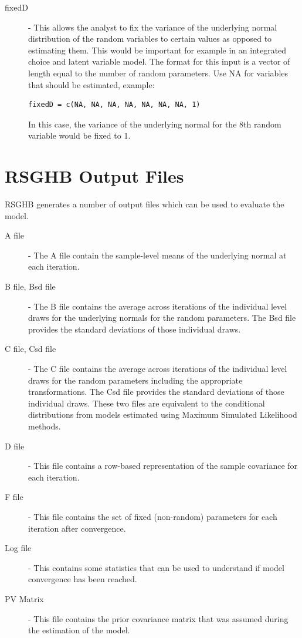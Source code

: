 \documentclass{article}\usepackage[]{graphicx}\usepackage[]{color}
\begin{document}
\begin{description}
\item[fixedD] - This allows the analyst to fix the variance of the underlying normal distribution of the random variables to certain values as opposed to estimating them. This would be important for example in an integrated choice and latent variable model. The format for this input is a vector of length equal to the number of random parameters. Use NA for variables that should be estimated, example:
 \begin{verbatim}fixedD = c(NA, NA, NA, NA, NA, NA, NA, 1)\end{verbatim} In this case, the variance of the underlying normal for the 8th random variable would be fixed to 1.

\end{description}     

\section*{RSGHB Output Files}

RSGHB generates a number of output files which can be used to evaluate the model.

\begin{description}

\item[A file] - The A file contain the sample-level means of the underlying normal at each iteration. 

\item[B file, Bsd file] - The B file contains the average across iterations of the individual level draws for the underlying normals for the random parameters. The Bsd file provides the standard deviations of those individual draws. 

\item[C file, Csd file] - The C file contains the average across iterations of the individual level draws for the random parameters including the appropriate transformations. The Csd file provides the standard deviations of those individual draws. These two files are equivalent to the conditional distributions from models estimated using Maximum Simulated Likelihood methods.

\item[D file] - This file contains a row-based representation of the sample covariance for each iteration.

\item[F file] - This file contains the set of fixed (non-random) parameters for each iteration after convergence.

\item[Log file] - This contains some statistics that can be used to understand if model convergence has been reached.

\item[PV Matrix] - This file contains the prior covariance matrix that was assumed during the estimation of the model.

\end{description}  
\end{document}
